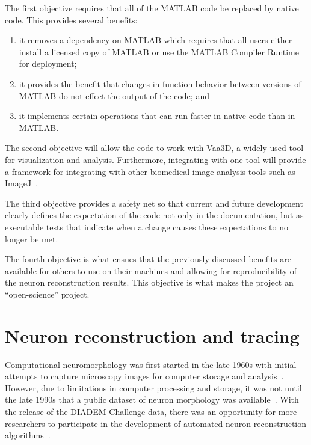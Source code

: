 The first objective requires that all of the MATLAB code be
replaced by native code. This provides several benefits:
\begin{enumerate}[label={\alph*)}]
	\item it removes a dependency on MATLAB which requires that
		all users either install a licensed copy of MATLAB
		or use the MATLAB Compiler Runtime for deployment;
	\item it provides the benefit that changes in
		function behavior between versions of
		MATLAB do not effect the output of the
		code; and
	\item it implements certain operations that can run faster in native code than
		in MATLAB.
\end{enumerate}

The second objective will allow the code to work with Vaa3D, a widely used
tool for visualization and analysis. Furthermore, integrating with
one tool will provide a framework for integrating with other
biomedical image analysis tools such as ImageJ~\autocite{Schneider2012}.

The third objective provides a safety net so that current and
future development clearly defines the expectation of the code
not only in the documentation, but as executable tests that
indicate when a change causes these expectations to no
longer be met.

The fourth objective is what ensues that the previously discussed
benefits are available for others to use on their machines and
allowing for reproducibility of the neuron reconstruction results.
This objective is what makes the project an ``open-science''
project.

\section{Neuron reconstruction and tracing}\label{sec:neuron-tracing}

Computational neuromorphology was first started in the late 1960s
with initial attempts to capture microscopy images for computer
storage and analysis~\autocite{NeuroMorphTrends:Halavi:2012,NeuroTracePerspect:Meijering:2010}.
However, due to limitations in computer processing and storage, it
was not until the late 1990s that a public dataset of neuron
morphology was available~\autocite{Duke-Southampton-archive:Cannon:1998}.
With the release of the DIADEM Challenge data, there was an
opportunity for more researchers to participate in the development
of automated neuron reconstruction algorithms~\autocite{DIADEM-dataset:Brown:2011}.

